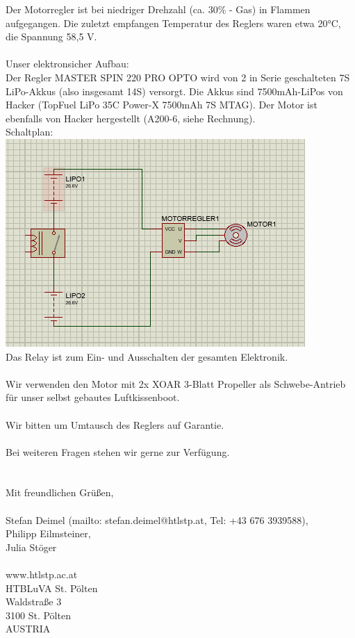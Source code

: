 \documentclass[12pt,a4paper,fleqn,liststotocnumbered,bibtotocnumbered]{scrartcl}
\begin{document}
Der Motorregler ist bei niedriger Drehzahl (ca. 30\% - Gas) in Flammen aufgegangen. Die zuletzt empfangen Temperatur des Reglers waren etwa 20°C, die Spannung 58,5 V.
\\\\
Unser elektronsicher Aufbau:\\
Der Regler MASTER SPIN 220 PRO OPTO wird von 2 in Serie geschalteten 7S LiPo-Akkus (also insgesamt 14S) versorgt. Die Akkus sind 7500mAh-LiPos von Hacker (TopFuel LiPo 35C Power-X 7500mAh 7S MTAG). Der Motor ist ebenfalls von Hacker hergestellt (A200-6, siehe Rechnung).\\
Schaltplan:\\
{\includegraphics[width=.7\textwidth]{2021-02-22-21-04-18.png}}\\
Das Relay ist zum Ein- und Ausschalten der gesamten Elektronik.\\
\\
Wir verwenden den Motor mit 2x XOAR 3-Blatt Propeller als Schwebe-Antrieb für unser selbst gebautes Luftkissenboot.\\
\\
Wir bitten um Umtausch des Reglers auf Garantie.\\\\
Bei weiteren Fragen stehen wir gerne zur Verfügung.\\
\\
\\
Mit freundlichen Grüßen,\\
\\
Stefan Deimel (mailto: stefan.deimel@htlstp.at, Tel: +43 676 3939588),\\
Philipp Eilmsteiner,\\
Julia Stöger\\
\\
www.htlstp.ac.at\\
HTBLuVA St. Pölten\\
Waldstraße 3\\
3100 St. Pölten\\
AUSTRIA
\end{document}
